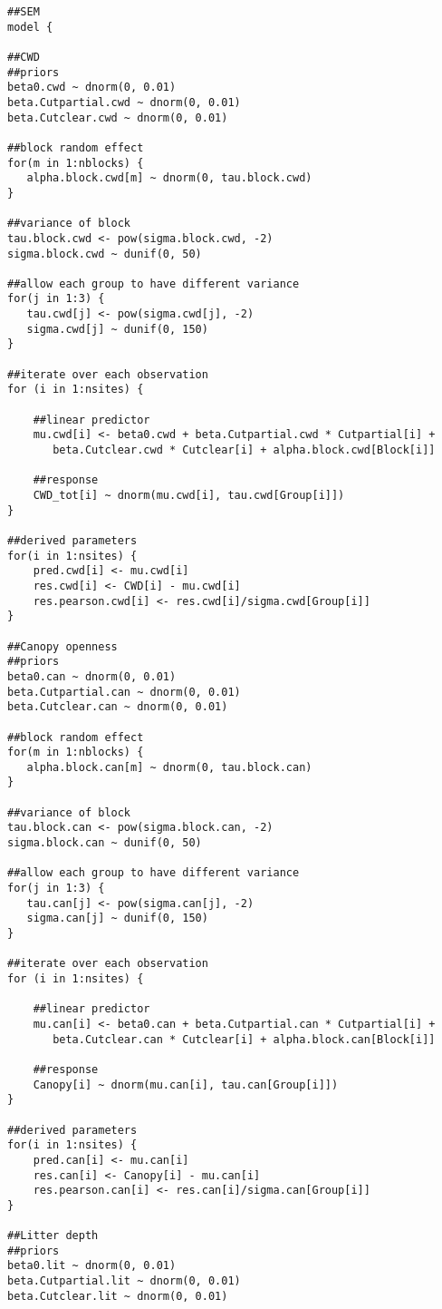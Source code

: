 \begin{lstlisting}
##SEM
model {

##CWD
##priors
beta0.cwd ~ dnorm(0, 0.01)
beta.Cutpartial.cwd ~ dnorm(0, 0.01)
beta.Cutclear.cwd ~ dnorm(0, 0.01)

##block random effect
for(m in 1:nblocks) {
   alpha.block.cwd[m] ~ dnorm(0, tau.block.cwd)
}

##variance of block
tau.block.cwd <- pow(sigma.block.cwd, -2)
sigma.block.cwd ~ dunif(0, 50)

##allow each group to have different variance
for(j in 1:3) {
   tau.cwd[j] <- pow(sigma.cwd[j], -2)
   sigma.cwd[j] ~ dunif(0, 150)
}

##iterate over each observation
for (i in 1:nsites) {

    ##linear predictor  
    mu.cwd[i] <- beta0.cwd + beta.Cutpartial.cwd * Cutpartial[i] + 
       beta.Cutclear.cwd * Cutclear[i] + alpha.block.cwd[Block[i]]

    ##response
    CWD_tot[i] ~ dnorm(mu.cwd[i], tau.cwd[Group[i]])
}

##derived parameters
for(i in 1:nsites) {
    pred.cwd[i] <- mu.cwd[i]
    res.cwd[i] <- CWD[i] - mu.cwd[i]
    res.pearson.cwd[i] <- res.cwd[i]/sigma.cwd[Group[i]]
}

##Canopy openness
##priors
beta0.can ~ dnorm(0, 0.01)
beta.Cutpartial.can ~ dnorm(0, 0.01)
beta.Cutclear.can ~ dnorm(0, 0.01)

##block random effect
for(m in 1:nblocks) {
   alpha.block.can[m] ~ dnorm(0, tau.block.can)
}

##variance of block
tau.block.can <- pow(sigma.block.can, -2)
sigma.block.can ~ dunif(0, 50)

##allow each group to have different variance
for(j in 1:3) {
   tau.can[j] <- pow(sigma.can[j], -2)
   sigma.can[j] ~ dunif(0, 150)
}

##iterate over each observation
for (i in 1:nsites) {

    ##linear predictor  
    mu.can[i] <- beta0.can + beta.Cutpartial.can * Cutpartial[i] + 
       beta.Cutclear.can * Cutclear[i] + alpha.block.can[Block[i]]

    ##response
    Canopy[i] ~ dnorm(mu.can[i], tau.can[Group[i]])
}

##derived parameters
for(i in 1:nsites) {
    pred.can[i] <- mu.can[i]
    res.can[i] <- Canopy[i] - mu.can[i]
    res.pearson.can[i] <- res.can[i]/sigma.can[Group[i]]
}

##Litter depth
##priors
beta0.lit ~ dnorm(0, 0.01)
beta.Cutpartial.lit ~ dnorm(0, 0.01)
beta.Cutclear.lit ~ dnorm(0, 0.01)


\end{lstlisting}
